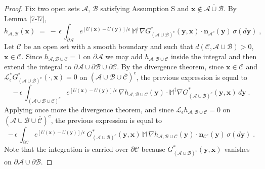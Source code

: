 \documentclass[reqno]{amsart}
\newcommand{\mc}[1]{{\mathcal #1}}
\newcommand{\bb}[1]{{\mathbb #1}}
\newcommand{\bs}[1]{{\boldsymbol #1}}
\newcommand{\<}{\langle}
\renewcommand{\>}{\rangle}
\begin{document}
\begin{proof}
Fix two open sets $\mc A$, $\mc B$ satisfying Assumption S and $\bs
x\not\in \overline{\mc A \cup\mc B}$. By Lemma \ref{7-l7},
\begin{equation*}
h_{\mc A, \mc B}(\bs x) \;=\;
-\, \epsilon\, \int_{\partial \mc A} e^{[U(\bs x) - U(\bs y)]/\epsilon} \, \bb
M^\dagger \nabla G_{(\mc A \cup \mc B)^c}^* (\bs y, \bs x)
\cdot \bs n_{\mc A^c}(\bs{y}) \, \sigma(d\bs y)\;,
\end{equation*}
Let $\mc C$ be an open set with a smooth boundary and such that $d(\mc
C ,\mc A \cup \mc B) >0$, $\bs x\in \mc C$. Since $h_{\mc A, \mc
  B\cup\mc C}=1$ on $\partial \mc A$ we may add $h_{\mc A, \mc
  B\cup\mc C}$ inside the integral and then extend the integral to
$\partial \mc A \cup \partial \mc B \cup \partial \mc C$.  By the
divergence theorem, since $\bs x\in \mc C$ and $\mc L_\epsilon^*
G_{(\mc A \cup \mc B)^c}^* (\cdot, \bs x)=0$ on $(\mc A \cup \mc B
\cup \overline{\mc C})^c$, the previous expression is equal to
\begin{equation*}
-\, \epsilon\, \int_{(\mc A \cup  \mc B \cup \mc C)^c}
e^{[U(\bs x) - U(\bs y)]/\epsilon} \,
\nabla h_{\mc A, \mc B\cup\mc C} (\bs y) \cdot \bb M^\dagger
\nabla G_{(\mc A \cup \mc B)^c}^* (\bs y, \bs x) \, d\bs y \;.
\end{equation*}
Applying once more the divergence theorem, and since $\mc L_\epsilon
h_{\mc A, \mc B\cup\mc C} =0$ on $(\mc A \cup \mc B \cup \overline{\mc
  C})^c$, the previous expression is equal to
\begin{equation}\label{ha1}
-\, \epsilon\, \int_{\partial \mc C}
e^{[U(\bs x) - U(\bs y)]/\epsilon} \,
G_{(\mc A \cup \mc B)^c}^* (\bs y, \bs x)
\, \bb M \, \nabla h_{\mc A, \mc B\cup\mc C} (\bs y)
\cdot \bs n_{\mc C^c}(\bs{y}) \, \sigma(d\bs y)\;.
\end{equation}
Note that the integration is carried over $\partial \mc C$ because
$G_{(\mc A \cup \mc B)^c}^* (\bs y, \bs x)$ vanishes on $\partial \mc
A\cup \partial \mc B$.


\end{proof}
\end{document}
